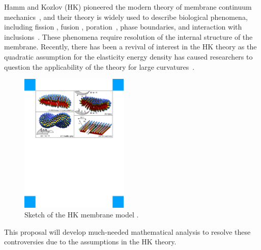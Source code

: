Hamm and Kozlov (HK) pioneered the modern theory of membrane continuum
mechanics~\cite{Hamm2000}, and their theory is widely used to describe
biological phenomena, including fission \cite{FrEsAkSh15, Maetal15,
PhysRevE.79.031926}, fusion \cite{ChKo08,
KoKo2002,Kuzmin7235,Aeffner2012}, poration~\cite{Gaetal20}, phase
boundaries, and interaction with inclusions~\cite{SeLeMaEg17,Saetal20,
Pietal20}. These phenomena require resolution of the internal structure
of the membrane.  Recently, there has been a revival of interest in the
HK theory as the quadratic assumption for the elasticity energy density
has caused researchers to question the applicability of the theory for
large curvatures~\cite{PhysRevLett.117.188102, ARGUDO20161619}.
%
\begin{figure}
\centerline{\includegraphics[width=0.46\textwidth]{Figures/Deformations.pdf}}
  \vspace{-5pt}
\caption{\label{fig:deformations} \footnotesize Sketch of the HK
 membrane model \cite{Hamm2000}.}
\end{figure}
%
This proposal will develop much-needed mathematical analysis to resolve
these controversies due to the assumptions in the HK theory. 



